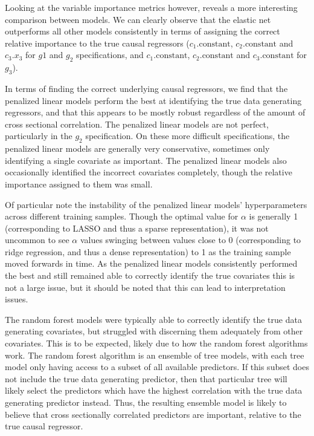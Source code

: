 \documentclass[11pt, a4paper, table]{article}
\begin{document}
Looking at the variable importance metrics however, reveals a more interesting comparison between models. We can clearly observe that the elastic net outperforms all other models consistently in terms of assigning the correct relative importance to the true causal regressors ($c_1.\text{constant}$, $c_2.\text{constant}$ and $c_3.x_3$ for $g1$ and $g_2$ specifications, and $c_1.\text{constant}$, $c_2.\text{constant}$ and $c_3.\text{constant}$ for $g_3$). 

In terms of finding the correct underlying causal regressors, we find that the penalized linear models perform the best at identifying the true data generating regressors, and that this appears to be mostly robust regardless of the amount of cross sectional correlation. The penalized linear models are not perfect, particularly in the $g_2$ specification. On these more difficult specifications, the penalized linear models are generally very conservative, sometimes only identifying a single covariate as important. The penalized linear models also occasionally identified the incorrect covariates completely, though the relative importance assigned to them was small.

Of particular note the instability of the penalized linear models' hyperparameters across different training samples. Though the optimal value for $\alpha$ is generally 1 (corresponding to LASSO and thus a sparse representation), it was not uncommon to see $\alpha$ values swinging between values close to 0 (corresponding to ridge regression, and thus a dense representation) to 1 as the training sample moved forwards in time. As the penalized linear models consistently performed the best and still remained able to correctly identify the true covariates this is not a large issue, but it should be noted that this can lead to interpretation issues.

The random forest models were typically able to correctly identify the true data generating covariates, but struggled with discerning them adequately from other covariates. This is to be expected, likely due to how the random forest algorithms work. The random forest algorithm is an ensemble of tree models, with each tree model only having access to a subset of all available predictors. If this subset does not include the true data generating predictor, then that particular tree will likely select the predictors which have the highest correlation with the true data generating predictor instead. Thus, the resulting ensemble model is likely to believe that cross sectionally correlated predictors are important, relative to the true causal regressor.
\end{document}
